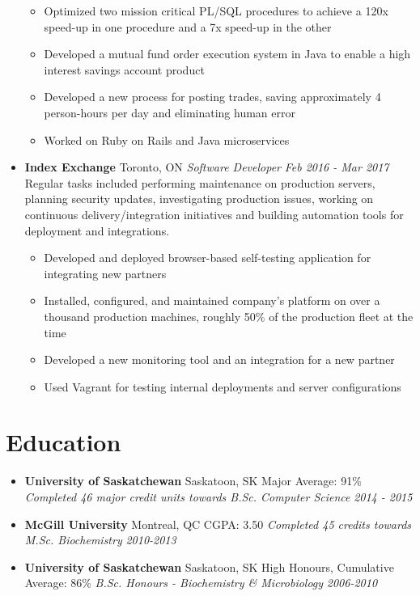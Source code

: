 \documentclass[letterpaper,11pt]{article}
\newcommand{\resumeSubHeading}[4]{
	\item[]
      \textbf{#1} \hfill #2 \newline
      \textit{#3} \hfill \textit{#4}
}
\newcommand{\resumeSubHeadingEducation}[5]{
	\item[]
      \textbf{#1} \hfill #2 \newline
      #3 \newline
      \textit{#4} \hfill \textit{#5}
}
\begin{document}
\begin{itemize}[leftmargin=*]
\begin{itemize}[noitemsep,topsep=0pt]
      	\item Optimized two mission critical PL/SQL procedures to achieve a 120x speed-up in one procedure and a 7x speed-up in the other
      	\item Developed a mutual fund order execution system in Java to enable a high interest savings account product
      	\item Developed a new process for posting trades, saving approximately 4 person-hours per day and eliminating human error
        \item Worked on Ruby on Rails and Java microservices
      \end{itemize}
	    
	\resumeSubHeading
      {Index Exchange}{Toronto, ON}
      {Software Developer}{Feb 2016 - Mar 2017}\newline
      Regular tasks included performing maintenance on production servers, planning security updates, investigating production issues, working on continuous delivery/integration initiatives and building automation tools for deployment and integrations.
      \begin{itemize}[noitemsep,topsep=0pt]
        \item Developed and deployed browser-based self-testing application for integrating new partners
        \item Installed, configured, and maintained company's platform on over a thousand production machines, roughly 50\% of the production fleet at the time
        \item Developed a new monitoring tool and an integration for a new partner
        \item Used Vagrant for testing internal deployments and server configurations
      \end{itemize}    
\end{itemize}

\newpage

\section{Education}
	\begin{itemize}[leftmargin=*]
	    \resumeSubHeadingEducation
	      {University of Saskatchewan}{Saskatoon, SK}
	      {Major Average: 91\%}
	      {Completed 46 major credit units towards B.Sc. Computer Science}{2014 - 2015}
	    \resumeSubHeadingEducation
	      {McGill University}{Montreal, QC}
	      {CGPA: 3.50}
	      {Completed 45 credits towards M.Sc. Biochemistry}{2010-2013}
      \resumeSubHeadingEducation
        {University of Saskatchewan}{Saskatoon, SK}
        {High Honours, Cumulative Average: 86\%}
        {B.Sc. Honours - Biochemistry \& Microbiology}{2006-2010}
     \end{itemize}
\end{document}
